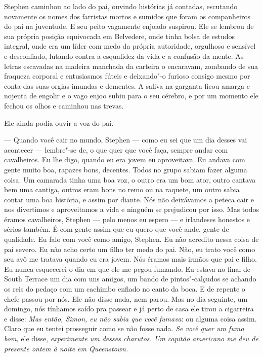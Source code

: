 Stephen caminhou ao lado do pai, ouvindo histórias já contadas,
escutando novamente os nomes dos farristas mortos e sumidos que foram
os companheiros do pai na juventude. E seu peito vagamente enjoado
suspirou. Ele se lembrou de sua própria posição equivocada em
Belvedere, onde tinha bolsa de estudos integral, onde era um líder com
medo da própria autoridade, orgulhoso e sensível e desconfiado, lutando
contra a esqualidez da vida e a confusão da mente. As letras escavadas
na madeira manchada da carteira o encaravam, zombando de sua fraqueza
corporal e entusiasmos fúteis e deixando"-o furioso consigo mesmo por
conta das suas orgias imundas e dementes. A saliva na garganta ficou
amarga e nojenta de engolir e o vago enjoo subiu para o seu cérebro, e
por um momento ele fechou os olhos e caminhou nas trevas.

Ele ainda podia ouvir a voz do pai.

 --- Quando você cair no mundo, Stephen --- como eu sei que um dia desses vai
acontecer --- lembre"-se de, o que quer que você faça, sempre andar com
cavalheiros. Eu lhe digo, quando eu era jovem eu aproveitava. Eu andava
com gente muito boa, rapazes bons, decentes. Todos no grupo sabiam
fazer alguma coisa. Um camarada tinha uma boa voz, o outro era um bom
ator, outro cantava bem uma cantiga, outros eram bons no remo ou na
raquete, um outro sabia contar uma boa história, e assim por diante.
Nós não deixávamos a peteca cair e nos divertimos e aproveitamos a vida
e ninguém se prejudicou por isso. Mas todos éramos cavalheiros, Stephen --- pelo
menos eu espero --- e irlandeses honestos e sérios também. É com gente
assim que eu quero que você ande, gente de qualidade. Eu falo com você
como amigo, Stephen. Eu não acredito nessa coisa de pai severo. Eu não
acho certo um filho ter medo do pai. Não, eu trato você como seu avô me
tratava quando eu era jovem. Nós éramos mais irmãos que pai e filho. Eu
nunca esquecerei o dia em que ele me pegou fumando. Eu estava no final
de South Terrace um dia com uns amigos, um bando de pintos"-calçudos se
achando os reis do pedaço com um cachimbo enfiado no canto da boca. E
de repente o chefe passou por nós. Ele não disse nada, nem parou. Mas 
no dia seguinte, um domingo, nós tínhamos saído pra passear e já perto
de casa ele tirou a cigarreira e disse: \textit{Mas então, Simon, eu
não sabia que você fumava}: ou alguma coisa assim. Claro que eu tentei
prosseguir como se não fosse nada. \textit{Se você quer um fumo bom,}
ele disse, \textit{experimente um desses charutos. Um capitão americano
me deu de presente ontem à noite em Queenstown.}

